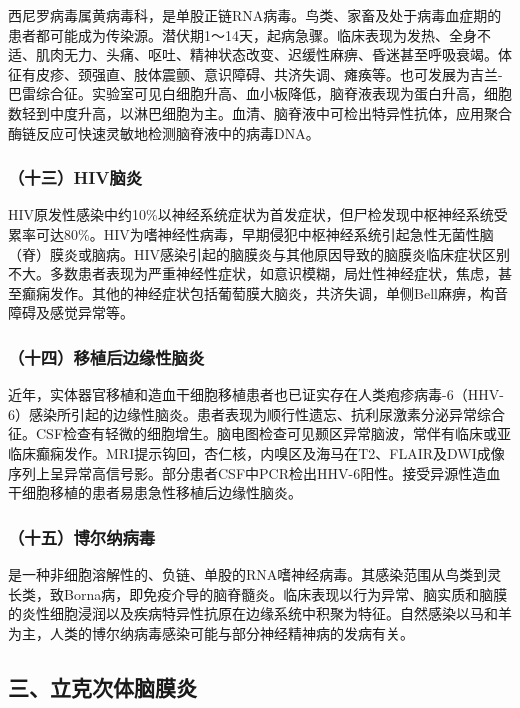 西尼罗病毒属黄病毒科，是单股正链RNA病毒。鸟类、家畜及处于病毒血症期的患者都可能成为传染源。潜伏期1～14天，起病急骤。临床表现为发热、全身不适、肌肉无力、头痛、呕吐、精神状态改变、迟缓性麻痹、昏迷甚至呼吸衰竭。体征有皮疹、颈强直、肢体震颤、意识障碍、共济失调、瘫痪等。也可发展为吉兰-巴雷综合征。实验室可见白细胞升高、血小板降低，脑脊液表现为蛋白升高，细胞数轻到中度升高，以淋巴细胞为主。血清、脑脊液中可检出特异性抗体，应用聚合酶链反应可快速灵敏地检测脑脊液中的病毒DNA。

\subsubsection{（十三）HIV脑炎}

HIV原发性感染中约10\%以神经系统症状为首发症状，但尸检发现中枢神经系统受累率可达80\%。HIV为嗜神经性病毒，早期侵犯中枢神经系统引起急性无菌性脑（脊）膜炎或脑病。HIV感染引起的脑膜炎与其他原因导致的脑膜炎临床症状区别不大。多数患者表现为严重神经性症状，如意识模糊，局灶性神经症状，焦虑，甚至癫痫发作。其他的神经症状包括葡萄膜大脑炎，共济失调，单侧Bell麻痹，构音障碍及感觉异常等。

\subsubsection{（十四）移植后边缘性脑炎}

近年，实体器官移植和造血干细胞移植患者也已证实存在人类疱疹病毒-6（HHV-6）感染所引起的边缘性脑炎。患者表现为顺行性遗忘、抗利尿激素分泌异常综合征。CSF检查有轻微的细胞增生。脑电图检查可见颞区异常脑波，常伴有临床或亚临床癫痫发作。MRI提示钩回，杏仁核，内嗅区及海马在T2、FLAIR及DWI成像序列上呈异常高信号影。部分患者CSF中PCR检出HHV-6阳性。接受异源性造血干细胞移植的患者易患急性移植后边缘性脑炎。

\subsubsection{（十五）博尔纳病毒}

是一种非细胞溶解性的、负链、单股的RNA嗜神经病毒。其感染范围从鸟类到灵长类，致Borna病，即免疫介导的脑脊髓炎。临床表现以行为异常、脑实质和脑膜的炎性细胞浸润以及疾病特异性抗原在边缘系统中积聚为特征。自然感染以马和羊为主，人类的博尔纳病毒感染可能与部分神经精神病的发病有关。

\protect\hypertarget{text00386.html}{}{}

\subsection{三、立克次体脑膜炎}

